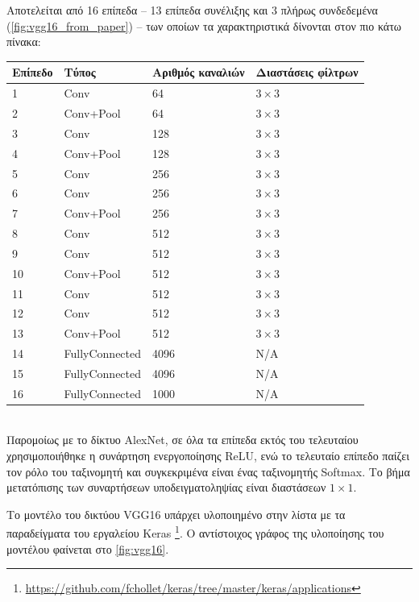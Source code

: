 Αποτελείται από 16 επίπεδα – 13 επίπεδα συνέλιξης και 3 πλήρως συνδεδεμένα (\autoref{fig:vgg16_from_paper}) – των
οποίων τα χαρακτηριστικά δίνονται στον πιο κάτω πίνακα:
\\

\begin{tabular}{ | l | l | l | l | }
  \hline
  \rowcolor{Gray}
  Επίπεδο  & Τύπος & Αριθμός καναλιών & Διαστάσεις φίλτρων \\
  \hline
  1 & Conv & 64 & $3 \times 3$ \\
  2 & Conv+Pool & 64 & $3 \times 3$ \\
  3 & Conv & 128 & $3 \times 3$ \\
  4 & Conv+Pool & 128 & $3 \times 3$ \\
  5 & Conv & 256 & $3 \times 3$ \\
  6 & Conv & 256 & $3 \times 3$ \\
  7 & Conv+Pool & 256 & $3 \times 3$ \\
  8 & Conv & 512 & $3 \times 3$ \\
  9 & Conv & 512 & $3 \times 3$ \\
  10 & Conv+Pool & 512 & $3 \times 3$ \\
  11 & Conv & 512 & $3 \times 3$ \\
  12 & Conv & 512 & $3 \times 3$ \\
  13 & Conv+Pool & 512 & $3 \times 3$ \\
  14 & FullyConnected & 4096 & Ν/A \\
  15 & FullyConnected & 4096 & N/A \\
  16 & FullyConnected & 1000 & N/A \\
  \hline
\end{tabular}
\\

Παρομοίως με το δίκτυο AlexNet, σε όλα τα επίπεδα εκτός του τελευταίου χρησιμοποιήθηκε η συνάρτηση ενεργοποίησης
ReLU, ενώ το τελευταίο επίπεδο παίζει τον ρόλο του ταξινομητή και συγκεκριμένα
είναι ένας ταξινομητής Softmax. Το βήμα μετατόπισης των συναρτήσεων υποδειγματοληψίας
είναι διαστάσεων $1 \times 1$.

Το μοντέλο του δικτύου VGG16 υπάρχει υλοποιημένο στην λίστα με τα παραδείγματα
του εργαλείου Keras \footnote{\url{https://github.com/fchollet/keras/tree/master/keras/applications}}.
Ο αντίστοιχος γράφος της υλοποίησης του μοντέλου
φαίνεται στο \autoref{fig:vgg16}.

